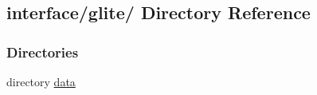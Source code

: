 \hypertarget{dir_000001}{
\subsection{interface/glite/ Directory Reference}
\label{dir_000001}
}
\subsubsection*{Directories}
\begin{CompactItemize}
\item 
directory \hyperlink{dir_000002}{data}
\end{CompactItemize}
